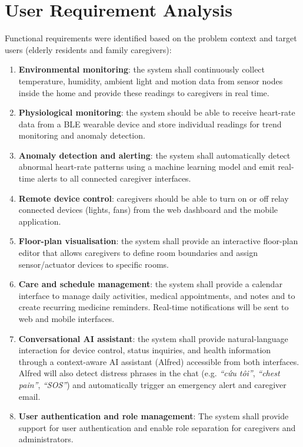 \section{User Requirement Analysis}
\label{sec:user_req}

Functional requirements were identified based on the problem context and target users (elderly residents and family caregivers):

\begin{enumerate}
    \item \textbf{Environmental monitoring}: the system shall continuously collect temperature, humidity, ambient light and motion data from sensor nodes inside the home and provide these readings to caregivers in real time.
   \item \textbf{Physiological monitoring}: the system should be able to receive heart-rate data from a BLE wearable device and store individual readings for trend monitoring and anomaly detection.
    \item \textbf{Anomaly detection and alerting}: the system shall automatically detect abnormal heart-rate patterns using a machine learning model and emit real-time alerts to all connected caregiver interfaces.
    \item \textbf{Remote device control}: caregivers should be able to turn on or off relay connected devices (lights, fans) from the web dashboard and the mobile application.
    \item \textbf{Floor-plan visualisation}: the system shall provide an
    interactive floor-plan editor that allows caregivers to define room boundaries
    and assign sensor/actuator devices to specific rooms.
    \item \textbf{Care and schedule management}: the system shall provide a calendar interface to manage daily activities, medical appointments, and notes and to create recurring medicine reminders. Real-time notifications will be sent to web and mobile interfaces.
    \item \textbf{Conversational AI assistant}: the system shall provide natural-language interaction for device control, status inquiries, and health information through a context-aware AI assistant (Alfred) accessible from both interfaces. Alfred will also detect distress phrases in the chat (e.g. \textit{``cứu tôi''}, \textit{``chest pain''}, \textit{``SOS''}) and automatically trigger an emergency alert and caregiver email.
    \item \textbf{User authentication and role management}: The system shall provide support for user authentication and enable role separation for caregivers and administrators.
\end{enumerate}

